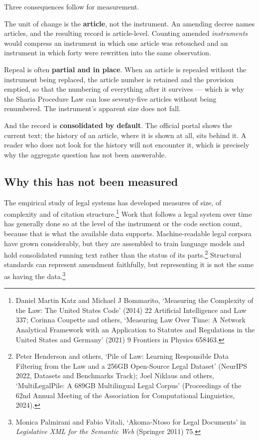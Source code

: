 \documentclass[11pt]{article}
\begin{document}
Three consequences follow for measurement.

The unit of change is the \textbf{article}, not the instrument. An amending
decree names articles, and the resulting record is article-level. Counting
amended \emph{instruments} would compress an instrument in which one article
was retouched and an instrument in which forty were rewritten into the same
observation.

Repeal is often \textbf{partial and in place}. When an article is repealed
without the instrument being replaced, the article number is retained and the
provision emptied, so that the numbering of everything after it survives ---
which is why the Sharia Procedure Law can lose seventy-five articles without
being renumbered. The instrument's apparent size does not fall.

And the record is \textbf{consolidated by default}. The official portal shows
the current text; the history of an article, where it is shown at all, sits
behind it. A reader who does not look for the history will not encounter it,
which is precisely why the aggregate question has not been answerable.

\subsection{Why this has not been measured}

The empirical study of legal systems has developed measures of size, of
complexity and of citation structure.\footnote{Daniel Martin Katz and Michael
J Bommarito, `Measuring the Complexity of the Law: The United States Code'
(2014) 22 Artificial Intelligence and Law 337; Corinna Coupette and others,
`Measuring Law Over Time: A Network Analytical Framework with an Application
to Statutes and Regulations in the United States and Germany' (2021) 9
Frontiers in Physics 658463.} Work that follows a legal system over time has
generally done so at the level of the instrument or the code section count,
because that is what the available data supports. Machine-readable legal
corpora have grown considerably, but they are assembled to train language
models and hold consolidated running text rather than the status of its
parts.\footnote{Peter Henderson and others, `Pile of Law: Learning
Responsible Data Filtering from the Law and a 256GB Open-Source Legal
Dataset' (NeurIPS 2022, Datasets and Benchmarks Track); Joel Niklaus and
others, `MultiLegalPile: A 689GB Multilingual Legal Corpus' (Proceedings of
the 62nd Annual Meeting of the Association for Computational Linguistics,
2024).} Structural standards can represent amendment faithfully, but
representing it is not the same as having the data.\footnote{Monica
Palmirani and Fabio Vitali, `Akoma-Ntoso for Legal Documents' in
\emph{Legislative XML for the Semantic Web} (Springer 2011) 75.}
\end{document}
